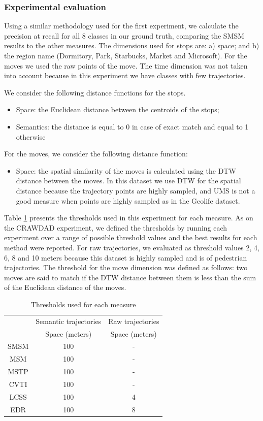 \documentclass[12pt]{article}
\begin{document}
\subsubsection{Experimental evaluation}

Using a similar methodology used for the first experiment, we calculate the precision at recall for all 8 classes in our ground truth, comparing the SMSM results to the other measures. The dimensions used for stops are: a) space; and b) the region name (Dormitory, Park, Starbucks, Market and Microsoft). For the moves we used the raw points of the move. The time dimension was not taken into account because in this experiment we have classes with few trajectories.

We consider the following distance functions for the stops.
\begin{itemize}
  \item Space: the Euclidean distance between the centroids of the stops;
  \item Semantics: the distance is equal to 0 in case of exact match and equal to 1 otherwise
\end{itemize}

For the moves, we consider the following distance function:
\begin{itemize}
  \item Space: the spatial similarity of the moves is calculated using the DTW distance between the moves. In this dataset we use DTW for the spatial distance because the trajectory points are highly sampled, and UMS is not a good measure when points are highly sampled as in the Geolife dataset.
\end{itemize}

Table \ref{tab:geolife_thresholds} presents the thresholds used in this experiment for each measure. As on the CRAWDAD experiment, we defined the thresholds by running each experiment over a range of possible threshold values and the best results for each method were reported. For raw trajectories, we evaluated as threshold values 2, 4, 6, 8 and 10 meters because this dataset is highly sampled and is of pedestrian trajectories. The threshold for the move dimension was defined as follows: two moves are said to match if the DTW distance between them is less than the sum of the Euclidean distance of the moves.

\begin{table}[!h]
\scriptsize
  \centering
  \begin{tabular}{|c|c|c|}
  	\hline
  & \multicolumn{1}{c|}{Semantic trajectories} & \multicolumn{1}{c|}{Raw trajectories} \\
 	\cline{2-3}
  & Space (meters) & Space (meters) \\
  	\hline
 SMSM & 100 & - \\
 MSM & 100 & - \\
 MSTP & 100 & -  \\
 CVTI & 100 & - \\
 LCSS & 100 & 4 \\
 EDR & 100 & 8 \\
    \hline
  \end{tabular}
  \caption{Thresholds used for each measure}
  \label{tab:geolife_thresholds}
\end{table}
\end{document}
